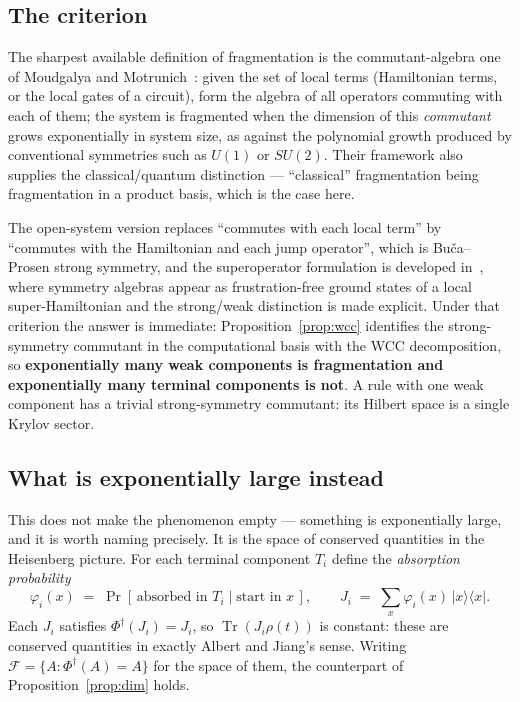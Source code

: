 \documentclass[11pt]{article}
\newcommand{\Tr}{\operatorname{Tr}}
\newcommand{\Phid}{\Phi^{\dagger}}
\theoremstyle{plain}
\theoremstyle{definition}
\theoremstyle{remark}
\begin{document}
\subsection{The criterion}

The sharpest available definition of fragmentation is the commutant-algebra
one of Moudgalya and Motrunich~\cite{mm2022}: given the set of local terms
(Hamiltonian terms, or the local gates of a circuit), form the algebra of all
operators commuting with each of them; the system is fragmented when the
dimension of this \emph{commutant} grows exponentially in system size, as
against the polynomial growth produced by conventional symmetries such as
$U(1)$ or $SU(2)$. Their framework also supplies the classical/quantum
distinction --- ``classical'' fragmentation being fragmentation in a product
basis, which is the case here.

The open-system version replaces ``commutes with each local term'' by
``commutes with the Hamiltonian and each jump operator'', which is
Bu\v{c}a--Prosen strong symmetry, and the superoperator formulation is
developed in~\cite{mm2024}, where symmetry algebras appear as frustration-free
ground states of a local super-Hamiltonian and the strong/weak distinction is
made explicit. Under that criterion the answer is immediate:
Proposition~\ref{prop:wcc} identifies the strong-symmetry commutant in the
computational basis with the WCC decomposition, so \textbf{exponentially many
weak components is fragmentation and exponentially many terminal components is
not}. A rule with one weak component has a trivial strong-symmetry commutant:
its Hilbert space is a single Krylov sector.

\subsection{What is exponentially large instead}

This does not make the phenomenon empty --- something is exponentially large,
and it is worth naming precisely. It is the space of conserved quantities in
the Heisenberg picture. For each terminal component $T_i$ define the
\emph{absorption probability}
\begin{equation}
  \varphi_i(x) \;=\; \Pr[\,\text{absorbed in } T_i \mid \text{start in } x\,],
  \qquad
  J_i \;=\; \sum_x \varphi_i(x)\, |x\rangle\langle x| .
  \label{eq:absorb}
\end{equation}
Each $J_i$ satisfies $\Phid(J_i) = J_i$, so $\Tr(J_i \rho(t))$ is constant:
these are conserved quantities in exactly Albert and Jiang's sense. Writing
$\mathcal{F} = \{A : \Phid(A) = A\}$ for the space of them, the counterpart of
Proposition~\ref{prop:dim} holds.
\end{document}
